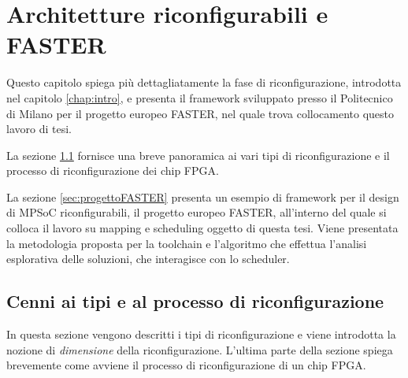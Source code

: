 \chapter{Architetture riconfigurabili e \acs{FASTER}}
\label{chap:recComputingFASTER}
\vspace{1cm}
Questo capitolo spiega pi\`u dettagliatamente la fase di
riconfigurazione, introdotta nel capitolo \ref{chap:intro}, e presenta il
framework sviluppato presso il Politecnico di Milano per il progetto
europeo \acs{FASTER}, nel quale trova collocamento questo lavoro di tesi.

La sezione \ref{sec:recComputingDettagli} fornisce una breve panoramica ai vari tipi di
riconfigurazione e il processo di riconfigurazione dei chip \ac{FPGA}.

La sezione \ref{sec:progettoFASTER} presenta un esempio di framework per il
design di \ac{MPSoC} riconfigurabili, il progetto europeo \acs{FASTER},
all'interno del quale si colloca il lavoro su mapping e scheduling oggetto di questa
tesi. Viene presentata la metodologia proposta per la toolchain e l'algoritmo
che effettua l'analisi esplorativa delle soluzioni, che interagisce con lo
scheduler.

\newpage

\section{Cenni ai tipi e al processo di riconfigurazione}
\label{sec:recComputingDettagli}
In questa sezione vengono descritti i tipi di riconfigurazione e viene introdotta
la nozione di \emph{dimensione} della riconfigurazione. L'ultima parte della sezione
spiega brevemente come avviene il processo di riconfigurazione di un chip \ac{FPGA}.
